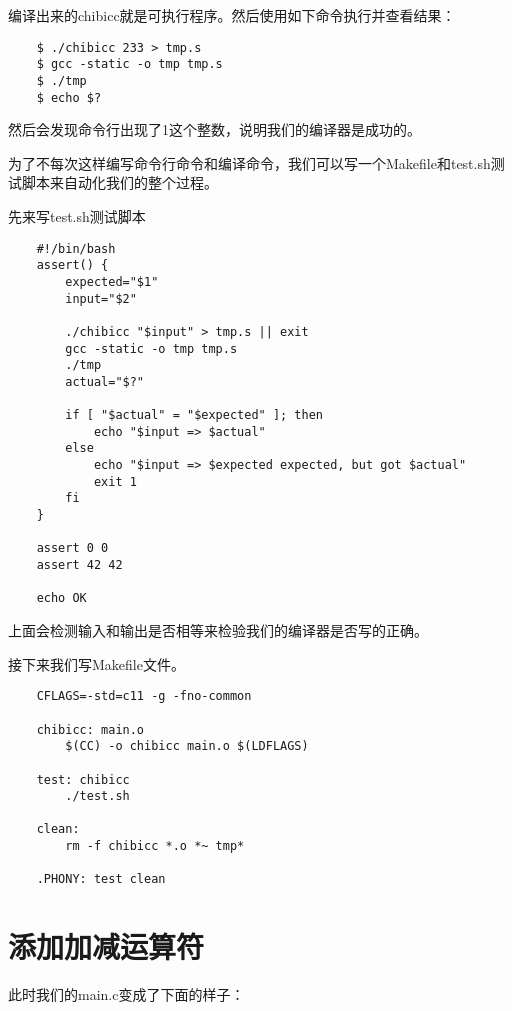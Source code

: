 \documentclass[cn,10pt,math=newtx,citestyle=gb7714-2015,bibstyle=gb7714-2015]{elegantbook}
\begin{document}
编译出来的chibicc就是可执行程序。然后使用如下命令执行并查看结果：

\begin{verbatim}
    $ ./chibicc 233 > tmp.s
    $ gcc -static -o tmp tmp.s
    $ ./tmp
    $ echo $?
\end{verbatim}

然后会发现命令行出现了1这个整数，说明我们的编译器是成功的。

为了不每次这样编写命令行命令和编译命令，我们可以写一个Makefile和test.sh测试脚本来自动化我们的整个过程。

先来写test.sh测试脚本

\begin{verbatim}
    #!/bin/bash
    assert() {
        expected="$1"
        input="$2"

        ./chibicc "$input" > tmp.s || exit
        gcc -static -o tmp tmp.s
        ./tmp
        actual="$?"

        if [ "$actual" = "$expected" ]; then
            echo "$input => $actual"
        else
            echo "$input => $expected expected, but got $actual"
            exit 1
        fi
    }

    assert 0 0
    assert 42 42

    echo OK
\end{verbatim}

上面会检测输入和输出是否相等来检验我们的编译器是否写的正确。

接下来我们写Makefile文件。

\begin{verbatim}
    CFLAGS=-std=c11 -g -fno-common

    chibicc: main.o
        $(CC) -o chibicc main.o $(LDFLAGS)

    test: chibicc
        ./test.sh

    clean:
        rm -f chibicc *.o *~ tmp*

    .PHONY: test clean
\end{verbatim}

\chapter{添加加减运算符}

此时我们的main.c变成了下面的样子：
\end{document}
